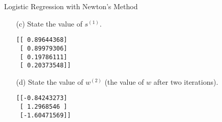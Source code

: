 \documentclass[section]{problemset}
\begin{document}
\begin{problem}{Logistic Regression with Newton's Method}
\begin{enumerate}
\begin{itemize}
\item[(c)]
State the value of $s^{(1)}$.
\begin{mdframed}
\begin{verbatim}
[[ 0.89644368]
 [ 0.89979306]
 [ 0.19786111]
 [ 0.20373548]]
\end{verbatim}
\end{mdframed}


\item[(d)]
State the value of $w^{(2)}$ (the value of $w$ after two iterations).
\begin{mdframed}
\begin{verbatim}
[[-0.84243273]
 [ 1.2968546 ]
 [-1.60471569]]
\end{verbatim}
\end{mdframed}

\end{itemize}
\end{enumerate}
\end{problem}


\newpage
\end{document}
